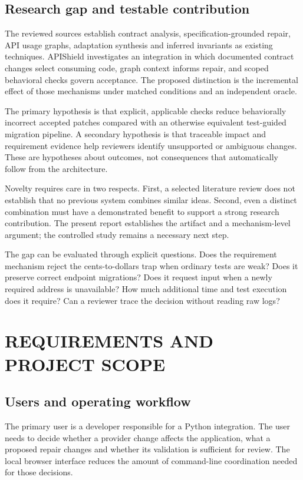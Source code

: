 \documentclass[12pt,a4paper,oneside]{report}
\begin{document}
\section{Research gap and testable contribution}

The reviewed sources establish contract analysis, specification-grounded repair, API usage graphs, adaptation synthesis and inferred invariants as existing techniques. APIShield investigates an integration in which documented contract changes select consuming code, graph context informs repair, and scoped behavioral checks govern acceptance. The proposed distinction is the incremental effect of those mechanisms under matched conditions and an independent oracle.

The primary hypothesis is that explicit, applicable checks reduce behaviorally incorrect accepted patches compared with an otherwise equivalent test-guided migration pipeline. A secondary hypothesis is that traceable impact and requirement evidence help reviewers identify unsupported or ambiguous changes. These are hypotheses about outcomes, not consequences that automatically follow from the architecture.

Novelty requires care in two respects. First, a selected literature review does not establish that no previous system combines similar ideas. Second, even a distinct combination must have a demonstrated benefit to support a strong research contribution. The present report establishes the artifact and a mechanism-level argument; the controlled study remains a necessary next step.

The gap can be evaluated through explicit questions. Does the requirement mechanism reject the cents-to-dollars trap when ordinary tests are weak? Does it preserve correct endpoint migrations? Does it request input when a newly required address is unavailable? How much additional time and test execution does it require? Can a reviewer trace the decision without reading raw logs?



\chapter{REQUIREMENTS AND PROJECT SCOPE}
\section{Users and operating workflow}

The primary user is a developer responsible for a Python integration. The user needs to decide whether a provider change affects the application, what a proposed repair changes and whether its validation is sufficient for review. The local browser interface reduces the amount of command-line coordination needed for those decisions.
\end{document}

